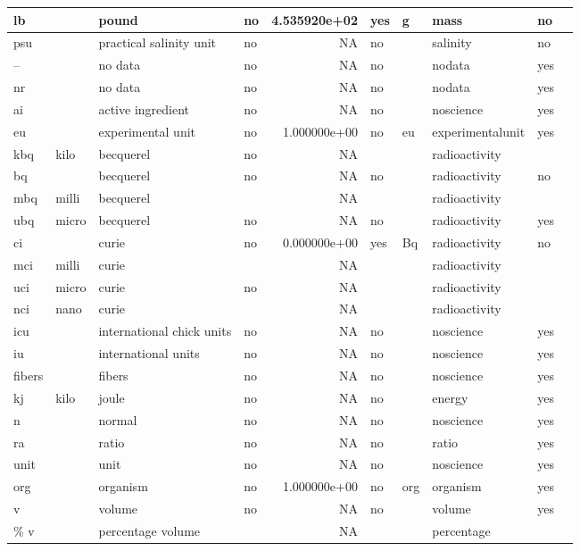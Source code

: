 \begin{tabular}{l|l|l|l|r|l|l|l|l|l}
\hline
lb &  & pound & no & 4.535920e+02 & yes & g & mass & no & \\
\hline
psu &  & practical salinity unit & no & NA & no &  & salinity & no & \\
\hline
-- &  & no data & no & NA & no &  & nodata & yes & \\
\hline
nr &  & no data & no & NA & no &  & nodata & yes & \\
\hline
ai &  & active ingredient & no & NA & no &  & noscience & yes & \\
\hline
eu &  & experimental unit & no & 1.000000e+00 & no & eu & experimentalunit & yes & \\
\hline
kbq & kilo & becquerel & no & NA &  &  & radioactivity &  & \\
\hline
bq &  & becquerel & no & NA & no &  & radioactivity & no & \\
\hline
mbq & milli & becquerel &  & NA &  &  & radioactivity &  & \\
\hline
ubq & micro & becquerel & no & NA & no &  & radioactivity & yes & \\
\hline
ci &  & curie & no & 0.000000e+00 & yes & Bq & radioactivity & no & \\
\hline
mci & milli & curie &  & NA &  &  & radioactivity &  & \\
\hline
uci & micro & curie & no & NA &  &  & radioactivity &  & \\
\hline
nci & nano & curie &  & NA &  &  & radioactivity &  & \\
\hline
icu &  & international chick units & no & NA & no &  & noscience & yes & \\
\hline
iu &  & international units & no & NA & no &  & noscience & yes & \\
\hline
fibers &  & fibers & no & NA & no &  & noscience & yes & \\
\hline
kj & kilo & joule & no & NA & no &  & energy & yes & \\
\hline
n &  & normal & no & NA & no &  & noscience & yes & \\
\hline
ra &  & ratio & no & NA & no &  & ratio & yes & \\
\hline
unit &  & unit & no & NA & no &  & noscience & yes & \\
\hline
org &  & organism & no & 1.000000e+00 & no & org & organism & yes & \\
\hline
v &  & volume & no & NA & no &  & volume & yes & \\
\hline
\% v &  & percentage volume &  & NA &  &  & percentage &  & \\

\end{tabular}
